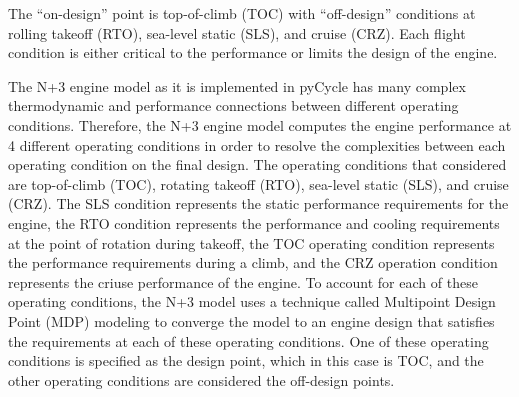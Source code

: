 \documentclass[conf]{new-aiaa}
\begin{document}
The ``on-design'' point is top-of-climb (TOC) with ``off-design'' conditions at rolling takeoff (RTO), sea-level static (SLS), and cruise (CRZ).
Each flight condition is either critical to the performance or limits the design of the engine.

The N+3 engine model as it is implemented in pyCycle has many complex thermodynamic and performance connections between different operating conditions.
Therefore, the N+3 engine model computes the engine performance at 4 different operating conditions in order to resolve the complexities between each operating condition on the final design.
The operating conditions that considered are top-of-climb (TOC), rotating takeoff (RTO), sea-level static (SLS), and cruise (CRZ).
The SLS condition represents the static performance requirements for the engine, the RTO condition represents the performance and cooling requirements at the point of rotation during takeoff, the TOC operating condition represents the performance requirements during a climb, and the CRZ operation condition represents the criuse performance of the engine.
To account for each of these operating conditions, the N+3 model uses a technique called Multipoint Design Point (MDP) modeling to converge the model to an engine design that satisfies the requirements at each of these operating conditions.
One of these operating conditions is specified as the design point, which in this case is TOC, and the other operating conditions are considered the off-design points.
\end{document}
